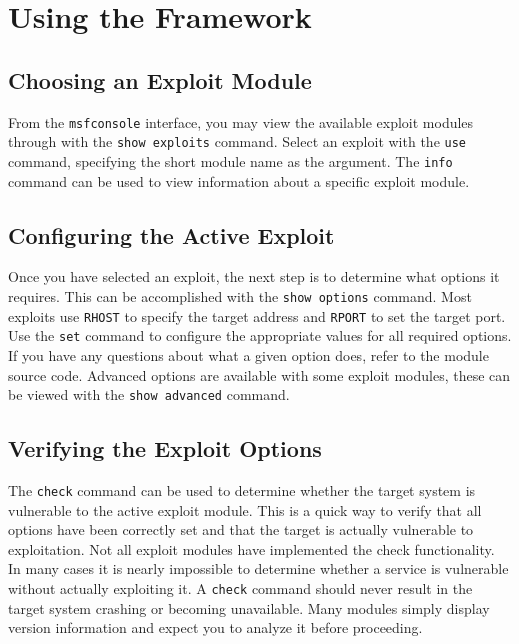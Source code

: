 \documentclass{report}
\begin{document}
\pagebreak

\chapter{Using the Framework}

	\section{Choosing an Exploit Module}
\par
From the \texttt{msfconsole} interface, you may view the available exploit
modules through with the \texttt{show exploits} command. Select an exploit
with the \texttt{use} command, specifying the short module name as the
argument. The \texttt{info} command can be used to view information about a
specific exploit module. 

	\section{Configuring the Active Exploit}

\par Once you have selected an exploit, the next step is to determine what
options it requires. This can be accomplished with the \texttt{show options}
command. Most exploits use \texttt{RHOST} to specify the target address and
\texttt{RPORT} to set the target port. Use the \texttt{set} command to
configure the appropriate values for all required options. If you have any
questions about what a given option does, refer to the module source code.
Advanced options are available with some exploit modules, these can be viewed
with the \texttt{show advanced} command. 

	\section{Verifying the Exploit Options}

\par	The \texttt{check} command can be used to determine whether the target
system is vulnerable to the active exploit module. This is a quick way to
verify that all options have been correctly set and that the target is
actually vulnerable to exploitation. Not all exploit modules have implemented
the check functionality.  In many cases it is nearly impossible to determine
whether a service is vulnerable without actually exploiting it. A
\texttt{check} command should never result in the target system crashing or
becoming unavailable. Many modules simply display version information and
expect you to analyze it before proceeding.  
\end{document}
